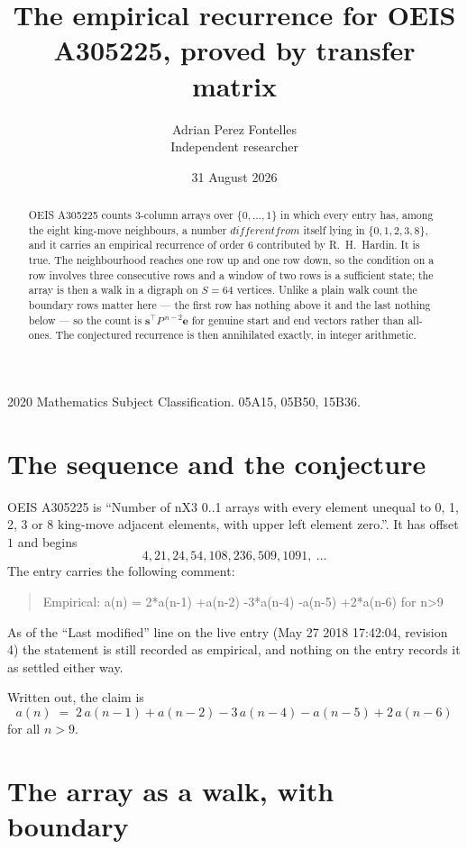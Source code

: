 \documentclass[11pt,a4paper]{article}
\title{The empirical recurrence for OEIS A305225, proved by transfer matrix}
\author{Adrian Perez Fontelles\\ \small Independent researcher}
\date{31 August 2026}
\theoremstyle{plain}
\theoremstyle{definition}
\begin{document}
\maketitle

\begin{abstract}
OEIS A305225 counts $3$-column arrays over $\{0,\dots,1\}$ in which every entry has,
among the eight king-move neighbours, a number $different from$ itself lying in $\{0,1,2,3,8\}$, and it carries an empirical
recurrence of order $6$ contributed by R.~H.~Hardin. It is true. The neighbourhood
reaches one row up and one row down, so the condition on a row involves three consecutive
rows and a window of two rows is a sufficient state; the array is then a walk in a digraph
on $S=64$ vertices. Unlike a plain walk count the boundary rows matter here --- the first
row has nothing above it and the last nothing below --- so the count is
$\mathbf{s}^{\!\top}P^{\,n-2}\mathbf{e}$ for genuine start and end vectors rather than
all-ones. The conjectured recurrence is then annihilated exactly, in integer arithmetic.
\end{abstract}

\noindent\small 2020 Mathematics Subject Classification. 05A15, 05B50, 15B36.\normalsize

\section{The sequence and the conjecture}

OEIS A305225 is ``Number of nX3 0..1 arrays with every element unequal to 0, 1, 2, 3 or 8 king-move adjacent elements, with upper left element zero.''. It has offset
$1$ and begins
\[
4, 21, 24, 54, 108, 236, 509, 1091,\ \dots
\]
The entry carries the following comment:
\begin{quote}\small
Empirical: a(n) = 2*a(n-1) +a(n-2) -3*a(n-4) -a(n-5) +2*a(n-6) for n>9
\end{quote}
As of the ``Last modified'' line on the live entry (May 27 2018 17:42:04, revision
4) the statement is still recorded as empirical, and nothing on the entry
records it as settled either way.

Written out, the claim is
\begin{equation}\label{eq:conj}
a(n)\;=\;2\,a(n-1) + a(n-2) - 3\,a(n-4) - a(n-5) + 2\,a(n-6)
\end{equation}
for all $n>9$.

\section{The array as a walk, with boundary}
\end{document}

